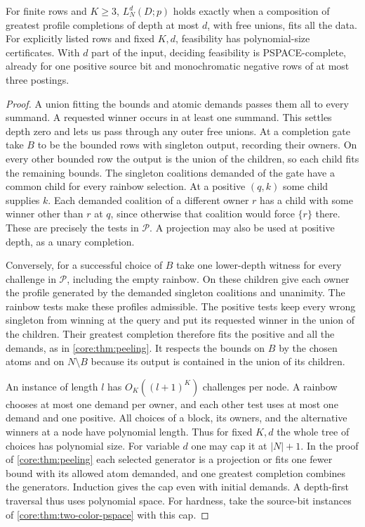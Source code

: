 \begin{theorem}
\label{core:thm:layer-interpolation}
For finite rows and $K\ge3$, $L^d_N(D;p)$ holds exactly when a
composition of greatest profile completions of depth at most $d$,
with free unions, fits all the data. For explicitly listed rows and
fixed $K,d$, feasibility has polynomial-size certificates. With
$d$ part of the input, deciding feasibility is PSPACE-complete,
already for one positive source bit and monochromatic negative rows
of at most three postings.
\end{theorem}
\begin{proof}
A union fitting the bounds and atomic demands passes them all to
every summand. A requested winner occurs in at least one summand. This
settles depth zero and lets us pass through any outer free unions.
At a completion gate take $B$ to be the bounded rows with singleton
output, recording their owners. On every other bounded row the output
is the union of the children, so each child fits the remaining bounds.
The singleton coalitions demanded of the gate have a common child
for every rainbow selection. At a positive $(q,k)$ some child
supplies $k$. Each demanded coalition of a different owner $r$ has
a child with some winner other than $r$ at $q$, since otherwise that
coalition would force $\{r\}$ there. These are precisely the tests
in $\mathcal P$. A projection may also be used at positive depth,
as a unary completion.

Conversely, for a successful choice of $B$ take one lower-depth
witness for every challenge in $\mathcal P$, including the empty
rainbow. On these children give each owner the profile generated by
the demanded singleton coalitions and unanimity. The rainbow tests
make these profiles admissible. The positive tests keep every wrong
singleton from winning at the query and put its requested winner in
the union of the children. Their greatest completion therefore fits
the positive and all the demands, as in \cref{core:thm:peeling}.
It respects the bounds on $B$ by the chosen atoms and on $N\setminus B$
because its output is contained in the union of its children.

An instance of length $l$ has $O_K((l+1)^K)$ challenges per node.
A rainbow chooses at most one demand per owner, and each other test
uses at most one demand and one positive. All choices of a block,
its owners, and the alternative winners at a node have polynomial
length. Thus for fixed $K,d$ the whole tree of choices has polynomial
size. For variable $d$ one may cap it at $|N|+1$. In the proof of
\cref{core:thm:peeling} each selected generator is a projection or
fits one fewer bound with its allowed atom demanded, and one greatest
completion combines the generators. Induction gives the cap even
with initial demands. A depth-first traversal thus uses polynomial
space. For hardness, take the source-bit instances of
\cref{core:thm:two-color-pspace} with this cap.
\end{proof}

